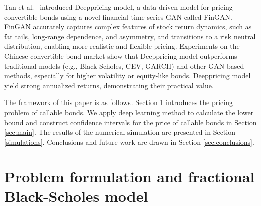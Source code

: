 \documentclass[reqno]{amsart}
\begin{document}
Tan et al.\ \cite{tan2022deeppricing} introduced Deeppricing model, a data-driven model 
for pricing convertible bonds using a novel financial time series GAN called FinGAN. 
FinGAN accurately captures complex features of stock return dynamics, such as fat tails, 
long-range dependence, and asymmetry, and transitions to a risk neutral distribution, 
enabling more realistic and flexible pricing. Experiments on the Chinese convertible 
bond market show that Deeppricing model outperforms traditional models (e.g., 
Black-Scholes, CEV, GARCH) and other GAN-based methods, especially for higher 
volatility or equity-like bonds. %
Deeppricing model yield strong annualized returns, demonstrating their practical value.

The framework of this paper is as follows. 
Section \ref{sec:basics} introduces the pricing problem of callable bonds. 
We apply deep learning method to calculate the lower bound and construct confidence 
intervals for the price of callable bonds in Section \ref{sec:main}. 
The results of the numerical simulation are presented in Section \ref{simulations}.
Conclusions and future work are drawn in Section \ref{sec:conclusions}.


\section{Problem formulation and fractional Black-Scholes model}
\label{sec:basics}
\end{document}
